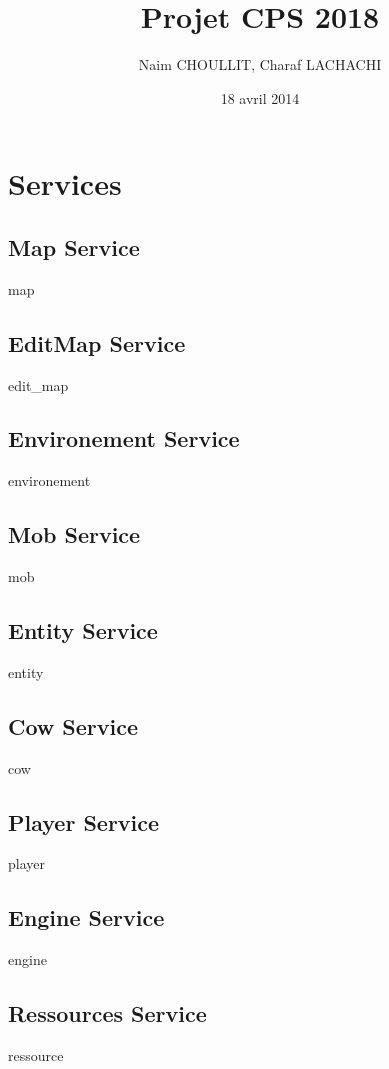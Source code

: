\documentclass[11pt]{article}
\title{Projet CPS 2018}
\author{Naim CHOULLIT, Charaf LACHACHI}
\date{18 avril 2014}
\begin{document}
\maketitle
\newpage
\setcounter{tocdepth}{3}
\tableofcontents
\newpage
\section{Services}
\subsection{Map Service}
	{map}
	\newpage
\subsection{EditMap Service}
	{edit_map}
	\newpage
\subsection{Environement Service}
	{environement}
	\newpage
\subsection{Mob Service}
	{mob}
	\newpage
\subsection{Entity Service}
	{entity}
\subsection{Cow Service}
	{cow}
	\newpage
\subsection{Player Service}
	{player}
	\newpage
\subsection{Engine Service}
	{engine}
	\newpage
\subsection{Ressources Service}
	{ressource}
\end{document}
